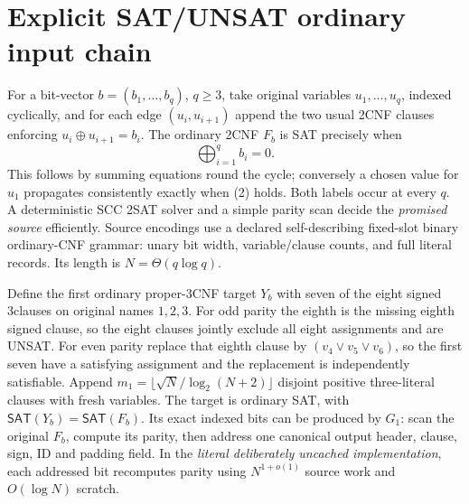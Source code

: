 \documentclass[11pt]{article}
\newcommand{\SAT}{\mathsf{SAT}}
\begin{document}
\section{Explicit SAT/UNSAT ordinary input chain}
For a bit-vector \(b=(b_1,\dots,b_q)\), \(q\ge3\), take original
variables \(u_1,\dots,u_q\), indexed cyclically, and for each edge
\((u_i,u_{i+1})\) append the two usual 2CNF clauses enforcing
\(u_i\oplus u_{i+1}=b_i\). The ordinary 2CNF \(F_b\) is SAT precisely when
\[
\bigoplus_{i=1}^{q}b_i=0.
\tag{2}
\]
This follows by summing equations round the cycle; conversely a chosen
value for \(u_1\) propagates consistently exactly when (2) holds.
Both labels occur at every \(q\). A deterministic SCC 2SAT solver and a
simple parity scan decide the \emph{promised source} efficiently.
Source encodings use a declared self-describing fixed-slot binary
ordinary-CNF grammar: unary bit width, variable/clause counts, and full
literal records. Its length is \(N=\Theta(q\log q)\).

Define the first ordinary proper-3CNF target \(Y_b\) with seven of the
eight signed 3clauses on original names \(1,2,3\).
For odd parity the eighth is the missing eighth signed clause, so the
eight clauses jointly exclude all eight assignments and are UNSAT.
For even parity replace that eighth clause by
\((v_4\vee v_5\vee v_6)\), so the first seven have a satisfying
assignment and the replacement is independently satisfiable.
Append \(m_1=\lfloor\sqrt N/\log_2(N+2)\rfloor\)
disjoint positive three-literal clauses with fresh variables.
The target is ordinary SAT, with \(\SAT(Y_b)=\SAT(F_b)\).
Its exact indexed bits can be produced by \(G_1\): scan the original
\(F_b\), compute its parity, then address one canonical output header,
clause, sign, ID and padding field. In the \emph{literal deliberately
uncached implementation}, each addressed bit recomputes parity using
\(N^{1+o(1)}\) source work and \(O(\log N)\) scratch.
\end{document}
